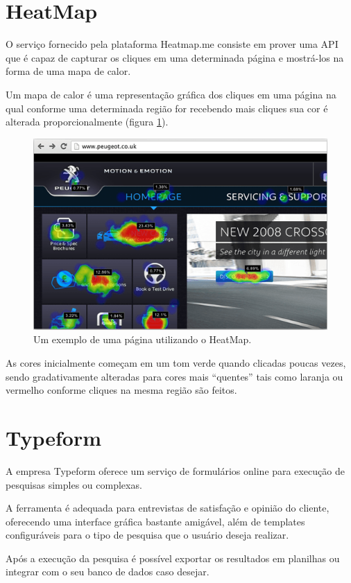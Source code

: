 \section{HeatMap}
\par O serviço fornecido pela plataforma Heatmap.me consiste em prover uma API que é capaz de capturar os cliques em uma determinada página e mostrá-los na forma de uma mapa de calor.
\par Um mapa de calor é uma representação gráfica dos cliques em uma página na qual conforme uma determinada região for recebendo mais cliques sua cor é alterada proporcionalmente (figura \ref{fig:heatmap_explanation}).
\begin{figure}[htb]
\centering
\includegraphics[width=15cm]{figuras/heatmap_explanation}
\caption{\label{fig:heatmap_explanation} Um exemplo de uma página utilizando o HeatMap.}
\end{figure}
\par As cores inicialmente começam em um tom verde quando clicadas poucas vezes, sendo gradativamente alteradas para cores mais ``quentes'' tais como laranja ou vermelho conforme cliques na mesma região são feitos.

\section{Typeform}
\par A empresa Typeform oferece um serviço de formulários online para execução de pesquisas simples ou complexas.
\par A ferramenta é adequada para entrevistas de satisfação e opinião do cliente, oferecendo uma interface gráfica bastante amigável, além de templates configuráveis para o tipo de pesquisa que o usuário deseja realizar.
\par Após a execução da pesquisa é possível exportar os resultados em planilhas ou integrar com o seu banco de dados caso desejar.
